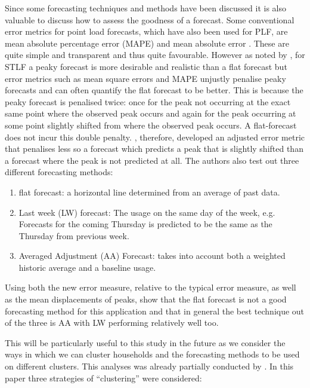 \documentclass[a4paper]{article}
\begin{document}
Since some forecasting techniques and methods have been discussed it is also valuable to discuss how to assess the goodness of a forecast. Some conventional error metrics for point load forecasts, which have also been used for PLF, are mean absolute percentage error (MAPE) and mean absolute error \citep{hong16}. These are quite simple and transparent and thus quite favourable. However as noted by \cite{dan14}, for STLF  a peaky forecast is more desirable and realistic than a flat forecast but error metrics such as mean square errors and MAPE unjustly penalise peaky forecasts and can often quantify the flat forecast to be better. This is because the peaky forecast is penalised twice: once for the peak not occurring at the exact same point where the observed peak occurs and again for the peak occurring at some point slightly shifted from where the observed peak occurs. A flat-forecast does not incur this double penalty. \citet{dan14}, therefore, developed an adjusted error metric that penalises less so a forecast which predicts a peak that is slightly shifted than a forecast where the peak is not predicted at all. The authors also test out three different forecasting methods:
\begin{enumerate}
\item flat forecast: a horizontal line determined from an average of past data.
\item Last week (LW) forecast: The usage on the same day of the week, e.g. Forecasts for the coming Thursday is predicted to be the same as the Thursday from previous week.
\item Averaged Adjustment (AA) Forecast: takes into account both a weighted historic average and a baseline usage.
\end{enumerate}

Using both the new error measure, relative to the typical error measure, as well as the mean displacements of peaks, \cite{dan14} show that the flat forecast is not a good forecasting method for this application and that in general the best technique out of the three is AA with LW performing relatively well too.

This will be particularly useful to this study in the future as we consider the ways in which we can cluster households and the forecasting methods to be used on different clusters. This analyses was already partially conducted by \cite{cbaf}. In this paper three strategies of ``clustering'' were considered:
\end{document}
